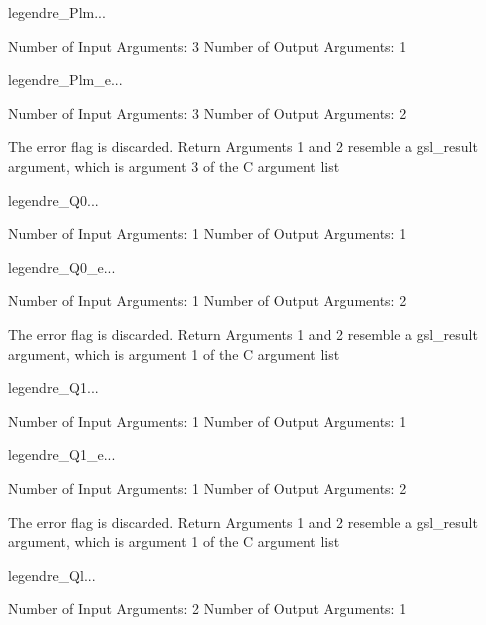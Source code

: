 \begin{funcdesc}{legendre_Plm}{...}

    Number of Input  Arguments:  3
    Number of Output Arguments:  1
\end{funcdesc}

\begin{funcdesc}{legendre_Plm_e}{...}

    Number of Input  Arguments:  3
    Number of Output Arguments:  2

The error flag is discarded.
Return Arguments 1 and 2 resemble a gsl_result argument,
	which is  argument 3 of the C argument list

\end{funcdesc}

\begin{funcdesc}{legendre_Q0}{...}

    Number of Input  Arguments:  1
    Number of Output Arguments:  1
\end{funcdesc}

\begin{funcdesc}{legendre_Q0_e}{...}

    Number of Input  Arguments:  1
    Number of Output Arguments:  2

The error flag is discarded.
Return Arguments 1 and 2 resemble a gsl_result argument,
	which is  argument 1 of the C argument list

\end{funcdesc}

\begin{funcdesc}{legendre_Q1}{...}

    Number of Input  Arguments:  1
    Number of Output Arguments:  1
\end{funcdesc}

\begin{funcdesc}{legendre_Q1_e}{...}

    Number of Input  Arguments:  1
    Number of Output Arguments:  2

The error flag is discarded.
Return Arguments 1 and 2 resemble a gsl_result argument,
	which is  argument 1 of the C argument list

\end{funcdesc}

\begin{funcdesc}{legendre_Ql}{...}

    Number of Input  Arguments:  2
    Number of Output Arguments:  1
\end{funcdesc}

